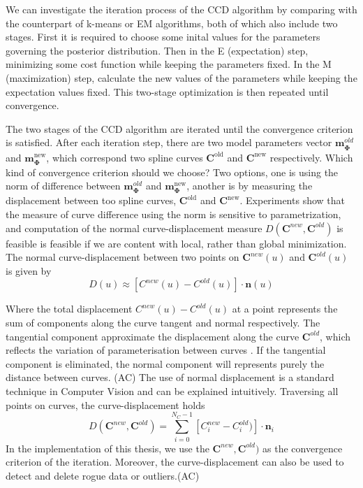 We can investigate the iteration process of  the CCD algorithm by
comparing with the counterpart of k-means or EM algorithms, both of
which also include two stages. First it is required to choose some
inital values for the parameters governing the posterior
distribution. Then in the E (expectation) step, minimizing some cost
function while keeping the parameters fixed. In the M (maximization)
step, calculate the new values of the parameters while keeping the
expectation values fixed. This two-stage optimization is then repeated
until convergence. 


The two stages of the CCD algorithm are iterated until the convergence
criterion is satisfied. After each iteration step, there are two
model parameters vector $\mathbf{m}_{\mathbf{\Phi}}^{old}$ and
$\mathbf{m}_{\mathbf{\Phi}}^{\mathrm{new}}$, which correspond two
spline curves $\mathbf{C}^{\mathrm{old}}$ and
$\mathbf{C}^{\mathrm{new}}$ respectively. Which kind of convergence
criterion should we choose? Two options, one is using the norm of
difference between $\mathbf{m}_{\mathbf{\Phi}}^{old}$ and
$\mathbf{m}_{\mathbf{\Phi}}^{\mathrm{new}}$, another is by measuring
the displacement between too spline curves, $\mathbf{C}^{\mathrm{old}}$ and
$\mathbf{C}^{\mathrm{new}}$. Experiments show that the measure of
curve difference using the norm is sensitive to parametrization, and
computation of the normal curve-displacement measure $D(\mathbf{C}^{new},
\mathbf{C}^{old})$  is feasible is feasible if we are content with
local, rather than global minimization. The normal curve-displacement
between two points on $\mathbf{C}^{new}(u)$ and $\mathbf{C}^{old}(u)$ is given by 
\begin{equation}
  \label{eq:5.32}
  D(u) \approx
  [C^{new}(u) - C^{old}(u)] \cdot \mathbf{n}(u)
\end{equation}

Where the total displacement $C^{new}(u) - C^{old}(u)$
 at a point represents the sum of components along
the curve tangent and normal respectively. The tangential component
approximate the displacement along the curve
$\mathbf{C}^{old}$, which reflects the variation of parameterisation
between curves . If the tangential component is eliminated, the normal
component will represents purely the distance between curves. (AC) The
use of normal displacement is a standard technique in Computer Vision
and can be explained intuitively. 
Traversing all points on curves, the curve-displacement holds
\begin{equation}
  \label{eq:5.33}
  D(\mathbf{C}^{new}, \mathbf{C}^{old})  = \sum_{i=0}^{N_{C}-1} [C_{i}^{new} - C_{i}^{old})] \cdot \mathbf{n}_{i}
\end{equation}
In the implementation of this thesis, we use the $\mathbf{C}^{new},
\mathbf{C}^{old})$ as the convergence criterion of the
iteration. Moreover, the curve-displacement can also be used to detect
and delete rogue data or outliers.(AC)

